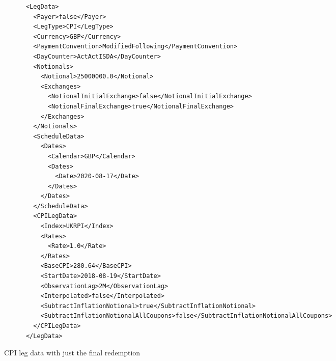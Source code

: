 \begin{listing}[H]
\begin{verbatim}
      <LegData>
        <Payer>false</Payer>
        <LegType>CPI</LegType>
        <Currency>GBP</Currency>
        <PaymentConvention>ModifiedFollowing</PaymentConvention>
        <DayCounter>ActActISDA</DayCounter>
        <Notionals>
          <Notional>25000000.0</Notional>
          <Exchanges>
            <NotionalInitialExchange>false</NotionalInitialExchange>
            <NotionalFinalExchange>true</NotionalFinalExchange>
          </Exchanges>
        </Notionals>
        <ScheduleData>
          <Dates>
            <Calendar>GBP</Calendar>
            <Dates>
              <Date>2020-08-17</Date>
            </Dates>
          </Dates>
        </ScheduleData>
        <CPILegData>
          <Index>UKRPI</Index>
          <Rates>
            <Rate>1.0</Rate>
          </Rates>
          <BaseCPI>280.64</BaseCPI>
          <StartDate>2018-08-19</StartDate>
          <ObservationLag>2M</ObservationLag>
          <Interpolated>false</Interpolated>
          <SubtractInflationNotional>true</SubtractInflationNotional>
          <SubtractInflationNotionalAllCoupons>false</SubtractInflationNotionalAllCoupons>
        </CPILegData>
      </LegData>
\end{verbatim}
\caption{CPI leg data with just the final redemption}
\label{lst:cpilegdatafinal}
\end{listing}

